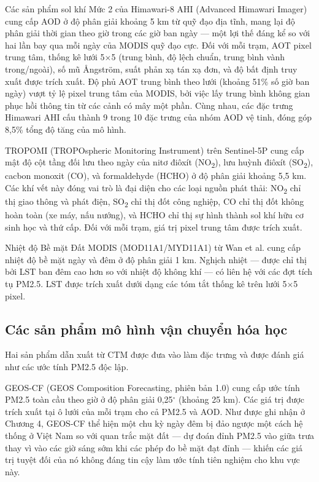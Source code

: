 Các sản phẩm sol khí Mức 2 của Himawari-8 AHI (Advanced Himawari Imager) cung cấp AOD ở độ phân giải khoảng 5 km từ quỹ đạo địa tĩnh, mang lại độ phân giải thời gian theo giờ trong các giờ ban ngày --- một lợi thế đáng kể so với hai lần bay qua mỗi ngày của MODIS quỹ đạo cực. Đối với mỗi trạm, AOT pixel trung tâm, thống kê lưới 5$\times$5 (trung bình, độ lệch chuẩn, trung bình vành trong/ngoài), số mũ Ångström, suất phản xạ tán xạ đơn, và độ bất định truy xuất được trích xuất. Độ phủ AOT trung bình theo lưới (khoảng 51\% số giờ ban ngày) vượt tỷ lệ pixel trung tâm của MODIS, bởi việc lấy trung bình không gian phục hồi thông tin từ các cảnh có mây một phần. Cùng nhau, các đặc trưng Himawari AHI cấu thành 9 trong 10 đặc trưng của nhóm AOD vệ tinh, đóng góp 8,5\% tổng độ tăng của mô hình.

TROPOMI (TROPOspheric Monitoring Instrument) trên Sentinel-5P cung cấp mật độ cột tầng đối lưu theo ngày của nitơ điôxít (NO\textsubscript{2}), lưu huỳnh điôxít (SO\textsubscript{2}), cacbon monoxit (CO), và formaldehyde (HCHO) ở độ phân giải khoảng 5,5 km. Các khí vết này đóng vai trò là đại diện cho các loại nguồn phát thải: NO\textsubscript{2} chỉ thị giao thông và phát điện, SO\textsubscript{2} chỉ thị đốt công nghiệp, CO chỉ thị đốt không hoàn toàn (xe máy, nấu nướng), và HCHO chỉ thị sự hình thành sol khí hữu cơ sinh học và thứ cấp. Đối với mỗi trạm, giá trị pixel trung tâm được trích xuất.

Nhiệt độ Bề mặt Đất MODIS (MOD11A1/MYD11A1) từ Wan et al. \cite{wan2021} cung cấp nhiệt độ bề mặt ngày và đêm ở độ phân giải 1 km. Nghịch nhiệt --- được chỉ thị bởi LST ban đêm cao hơn so với nhiệt độ không khí --- có liên hệ với các đợt tích tụ PM2.5. LST được trích xuất dưới dạng các tóm tắt thống kê trên lưới 5$\times$5 pixel.

\subsection{Các sản phẩm mô hình vận chuyển hóa học}

Hai sản phẩm dẫn xuất từ CTM được đưa vào làm đặc trưng và được đánh giá như các ước tính PM2.5 độc lập.

GEOS-CF (GEOS Composition Forecasting, phiên bản 1.0) cung cấp ước tính PM2.5 toàn cầu theo giờ ở độ phân giải 0,25$^\circ$ (khoảng 25 km). Các giá trị được trích xuất tại ô lưới của mỗi trạm cho cả PM2.5 và AOD. Như được ghi nhận ở Chương 4, GEOS-CF thể hiện một chu kỳ ngày đêm bị đảo ngược một cách hệ thống ở Việt Nam so với quan trắc mặt đất --- dự đoán đỉnh PM2.5 vào giữa trưa thay vì vào các giờ sáng sớm khi các phép đo bề mặt đạt đỉnh --- khiến các giá trị tuyệt đối của nó không đáng tin cậy làm ước tính tiên nghiệm cho khu vực này.

